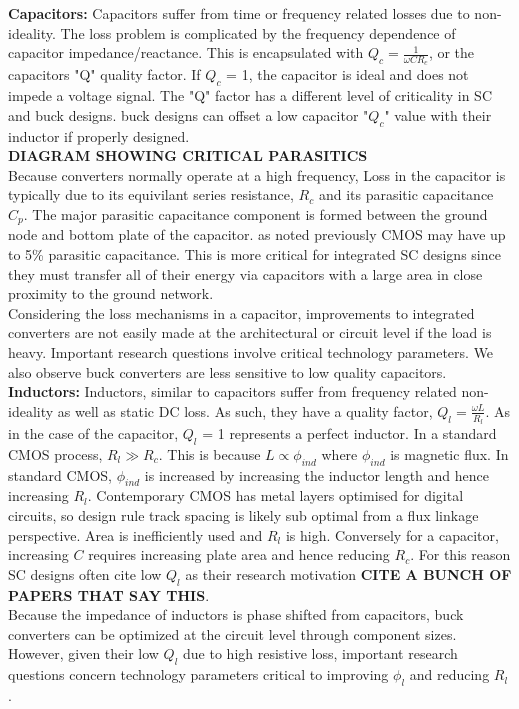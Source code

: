 \documentclass[letterpaper,twocolumn,10pt]{article}
\begin{document}
\textbf{Capacitors: }
Capacitors suffer from time or frequency related losses due to non-ideality. The loss problem is complicated by the frequency dependence of capacitor impedance/reactance. This is encapsulated with $Q_c=\frac{1}{\omega CR_c}$, or the capacitors "Q" quality factor. If $Q_c$ = 1, the capacitor is ideal and does not impede a voltage signal. The "Q" factor has a different level of criticality in SC and buck designs. buck designs can offset a low capacitor "$Q_c$" value with their inductor if properly designed.\\
\textbf{DIAGRAM SHOWING CRITICAL PARASITICS}\\
Because converters normally operate at a high frequency, Loss in the capacitor is typically due to its equivilant series resistance, $R_c$ and its parasitic capacitance $C_p$. The major parasitic capacitance component is formed between the ground node and bottom plate of the capacitor\cite{Damak2013}. as noted previously CMOS may have up to 5\% parasitic capacitance. This is more critical for integrated SC designs since they must transfer all of their energy via capacitors with a large area in close proximity to the ground network.\\
\indent Considering the loss mechanisms in a capacitor, improvements to integrated converters are not easily made at the architectural or circuit level if the load is heavy. Important research questions involve critical technology parameters. We also observe buck converters are less sensitive to low quality capacitors.\\
\textbf{Inductors: }Inductors, similar to capacitors suffer from frequency related non-ideality as well as static DC loss. As such, they have a quality factor, $Q_l = \frac{\omega L}{R_l}$. As in the case of the capacitor, $Q_l$ = 1 represents a perfect inductor. In a standard CMOS process, $R_l \gg R_c$. This is because $L \propto \phi_{ind}$ where $\phi_{ind}$ is magnetic flux. In standard CMOS, $\phi_{ind}$ is increased by increasing the inductor length and hence increasing $R_l$. Contemporary CMOS has metal layers optimised for digital circuits, so design rule track spacing is likely sub optimal from a flux linkage perspective. Area is inefficiently used and $R_l$ is high. Conversely for a capacitor, increasing $C$ requires increasing plate area and hence reducing $R_c$. For this reason SC designs often cite low $Q_l$ as their research motivation \textbf{CITE A BUNCH OF PAPERS THAT SAY THIS}.\\
\indent Because the impedance of inductors is phase shifted from capacitors, buck converters can be optimized at the circuit level through component sizes. However, given their low $Q_l$ due to high resistive loss, important research questions concern technology parameters critical to improving $\phi_l$ and reducing $R_l$.\\    
\end{document}
